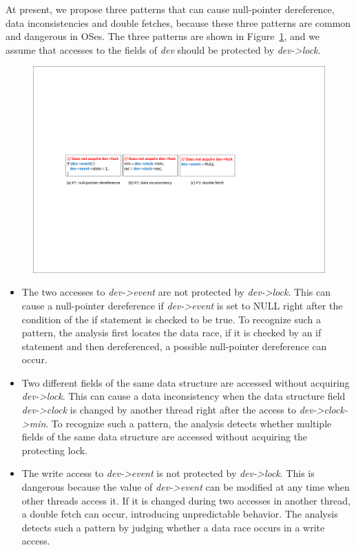 At present, we propose three patterns that can cause null-pointer dereference, 
data inconsistencies and double fetches, because these three patterns are 
common and dangerous in OSes. The three patterns are shown in 
Figure~\ref{fig_pattern}, and we assume that accesses to the fields of {\em 
dev} should be protected by {\em dev->lock}.

\begin{figure}[htbp]
	\centering
	\includegraphics[width=1\linewidth]{figures/fig_pattern.pdf}
	\label{fig_pattern}
\end{figure}

\begin{itemize}
	\item {} The two accesses to {\em 
	dev->event} 
	are not protected by {\em dev->lock}. This can cause a null-pointer 
	dereference if {\em dev->event} is set to NULL right after the condition of 
	the if statement is checked to be true. To recognize such a pattern, the 
	analysis first locates the data race, if it is checked by an if statement 
	and then dereferenced, a possible null-pointer dereference can occur.
	\item {} Two different fields of the same data 
	structure are accessed without acquiring {\em dev->lock}. This can cause a 
	data inconsistency when the data structure field {\em dev->clock} is 
	changed by another thread right after the access to {\em dev->clock->min}. 
	To recognize such a pattern, the analysis detects whether multiple fields 
	of 	the same data structure are accessed without acquiring the protecting 
	lock.
	\item {} The write access to {\em dev->event} is not 	
	protected by {\em dev->lock}. This is dangerous because the value of {\em 	
	dev->event} can be modified at any time when other threads access it. If it 
	is changed during two accesses in another thread, a double fetch can occur, 
	introducing unpredictable behavior. The analysis detects such a pattern by 
	judging whether a data race occurs in a write access.
\end{itemize}
